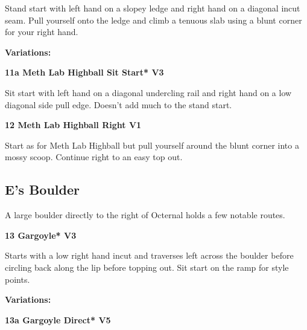 \begin{multicols}{2}
			\begin{adjustwidth}{0.5cm}{}				
			Stand start with left hand on a slopey ledge and right hand on a diagonal incut seam. Pull yourself onto the ledge and climb a tenuous slab using a blunt corner for your right hand.
			\end{adjustwidth}
				\begin{adjustwidth}{0.5cm}{}				
				\textbf{Variations:} \newline
					\label{vr:Meth Lab Highball Sit Start}
\colorbox{green!20}{
\parbox{0.95\linewidth}{
\textbf{
11a Meth Lab Highball Sit Start* V3  
}
}
}

					\begin{adjustwidth}{0.5cm}{}				
					Sit start with left hand on a diagonal undercling rail and right hand on a low diagonal side pull edge. Doesn't add much to the stand start.
					\end{adjustwidth}
				\end{adjustwidth}
			\label{rt:Meth Lab Highball Right}
\colorbox{green!20}{
\parbox{0.95\linewidth}{
\textbf{
12 Meth Lab Highball Right V1  
}
}
}

			\begin{adjustwidth}{0.5cm}{}				
			Start as for Meth Lab Highball but pull yourself around the blunt corner into a mossy scoop. Continue right to an easy top out.
			\end{adjustwidth}
		\subsection*{E's Boulder}\label{bf:E's Boulder}
		A large boulder directly to the right of Octernal holds a few notable routes.\\
	

			\label{rt:Gargoyle}
\colorbox{green!20}{
\parbox{0.95\linewidth}{
\textbf{
13 Gargoyle* V3  
}
}
}

			\begin{adjustwidth}{0.5cm}{}				
			Starts with a low right hand incut and traverses left across the boulder before circling back along the lip before topping out. Sit start on the ramp for style points.
			\end{adjustwidth}
				\begin{adjustwidth}{0.5cm}{}				
				\textbf{Variations:} \newline
					\label{vr:Gargoyle Direct}
\colorbox{RoyalBlue!20}{
\parbox{0.95\linewidth}{
\textbf{
13a Gargoyle Direct* V5  
}
}
}


\end{adjustwidth}
\end{multicols}
